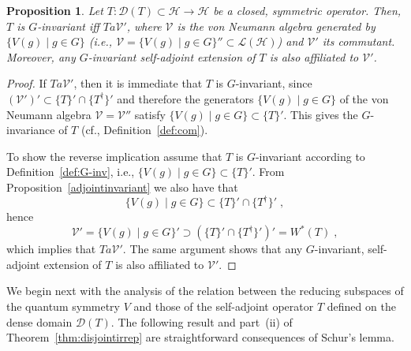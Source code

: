 \documentclass[a4paper,12pt]{amsart}
\renewcommand{\H}{\mathcal{H}}
\newcommand{\1}{\mathbb{I}}
\newtheorem{proposition}[theorem]{Proposition}
\numberwithin{equation}{section}
\numberwithin{theorem}{section}
\begin{document}
\begin{proposition}\label{pro:affiliate}
Let $T\colon\mathcal{D}(T)\subset\mathcal{H}\to \H$ be a closed, symmetric operator.
Then, $T$ is $G$-invariant iff $T a \mathcal{V}'$,
where $\mathcal V$ is the von Neumann algebra generated by $\{V(g)\mid g\in G\}$
(i.e.,
$
 \mathcal{V}=\{V(g)\mid g\in G\}''\subset\mathcal{L}(\mathcal{H})
$) and $\mathcal{V}'$ its commutant. Moreover, any $G$-invariant
self-adjoint extension of $T$ is also affiliated to $\mathcal{V}'$.
\end{proposition}
\begin{proof}

If $T a \mathcal{V}'$, then it is immediate that $T$ is $G$-invariant, since 
$(\mathcal{V}')'\subset\{T\}'\cap \{T^\dagger\}'$ and therefore the 
generators $\{V(g)\mid g\in G\}$ of the von Neumann algebra $\mathcal{V}=\mathcal{V}''$
satisfy $\{V(g)\mid g\in G\}\subset\{T\}'$. This gives the $G$-invariance of $T$ (cf.,
Definition~\ref{def:com}).

To show the reverse implication assume that $T$ is $G$-invariant according to 
Definition~\ref{def:G-inv}, i.e., $\{V(g)\mid g\in G\}\subset \{T\}'$.
From Proposition~\ref{adjointinvariant} we also have that
\[
 \{V(g)\mid g\in G\}\subset\{T\}'\cap \{T^\dagger\}'\;,
\]
hence
\[
 \mathcal{V}'=\{V(g)\mid g\in G\}'\supset\left(\{T\}'\cap \{T^\dagger\}'\right)'=W^*(T)\;,
\]
which implies that $T a \mathcal{V}'$. The same argument shows that any $G$-invariant, self-adjoint
extension of $T$ is also affiliated to $\mathcal{V}'$.
\end{proof}

We begin next with the analysis of the relation between the reducing subspaces of the 
quantum symmetry $V$ and those of the self-adjoint operator $T$ defined on the dense domain
$\mathcal{D}(T)$. The following result and part~(ii) of Theorem~\ref{thm:disjointirrep} are 
straightforward consequences of Schur's lemma.
\end{document}
